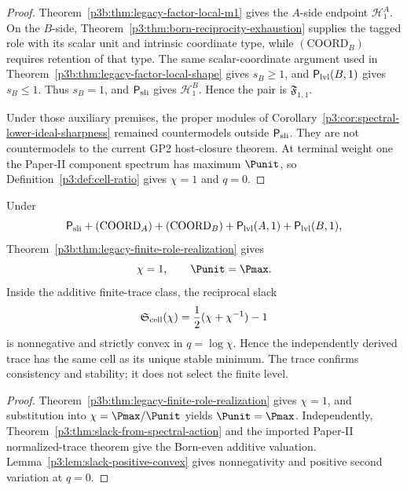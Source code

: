 \documentclass[11pt,a4paper]{article}
\begin{document}
\begin{proof}
Theorem~\ref{p3b:thm:legacy-factor-local-m1} gives the \(A\)-side endpoint
\(\mathcal H_1^A\).  On the \(B\)-side,
Theorem~\ref{p3:thm:born-reciprocity-exhaustion} supplies the tagged role with
its scalar unit and intrinsic coordinate type, while \((\mathrm{COORD}_B)\)
requires retention of that type.  The same scalar-coordinate argument used in
Theorem~\ref{p3b:thm:legacy-factor-local-shape} gives \(s_B\ge1\), and
\(\mathsf P_{\rm lvl}(B,1)\) gives \(s_B\le1\).  Thus \(s_B=1\), and
\(\mathsf P_{\rm sli}\) gives \(\mathcal H_1^B\).  Hence the pair is
\(\mathfrak F_{1,1}\).

Under those auxiliary premises, the proper modules of Corollary~\ref{p3:cor:spectral-lower-ideal-sharpness} remained countermodels outside \(\mathsf P_{\rm sli}\).  They are not countermodels to the current GP2 host-closure theorem.  At terminal weight one the Paper-II
component spectrum has maximum \(\Punit\), so
Definition~\ref{p3:def:cell-ratio} gives \(\chi=1\) and \(q=0\).
\end{proof}

\begin{theorem}
\label{p3b:thm:legacy-cell-stability}
Under
\[
 \mathsf P_{\rm sli}
 +(\mathrm{COORD}_A)+(\mathrm{COORD}_B)
 +\mathsf P_{\rm lvl}(A,1)+\mathsf P_{\rm lvl}(B,1),
\]
Theorem~\ref{p3b:thm:legacy-finite-role-realization} gives
\[
 \chi=1,
 \qquad
 \Punit=\Pmax.
\]
Inside the additive finite-trace class, the reciprocal slack
\[
 \mathfrak S_{\rm cell}(\chi)=\frac12(\chi+\chi^{-1})-1
\]
is nonnegative and strictly convex in \(q=\log\chi\).  Hence the independently
derived trace has the same cell as its unique stable minimum.  The trace
confirms consistency and stability; it does not select the finite level.
\end{theorem}

\begin{proof}
Theorem~\ref{p3b:thm:legacy-finite-role-realization} gives \(\chi=1\), and
substitution into \(\chi=\Pmax/\Punit\) yields \(\Punit=\Pmax\).
Independently, Theorem~\ref{p3:thm:slack-from-spectral-action} and the imported
Paper-II normalized-trace theorem give the Born-even additive valuation.
Lemma~\ref{p3:lem:slack-positive-convex} gives nonnegativity and positive
second variation at \(q=0\).
\end{proof}
\end{document}
